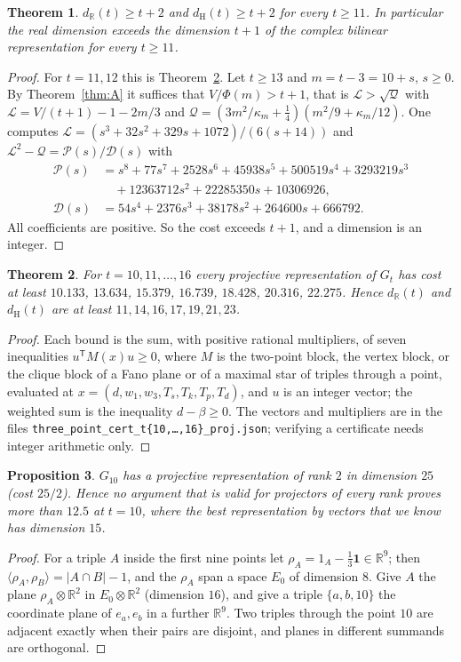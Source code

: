 \documentclass[11pt]{article}
\newtheorem{theorem}{Theorem}
\newtheorem{proposition}[theorem]{Proposition}
\theoremstyle{remark}
\newcommand{\R}{\mathbb{R}}
\newcommand{\ip}[2]{\langle #1,#2\rangle}
\newcommand{\Gt}{G_t}
\begin{document}
\begin{theorem}\label{thm:tplus2}
$d_\R(t)\ge t+2$ and $d_{\mathrm H}(t)\ge t+2$ for every $t\ge11$. In particular the real dimension exceeds the
dimension $t+1$ of the complex bilinear representation for every $t\ge11$.
\end{theorem}
\begin{proof}
For $t=11,12$ this is Theorem~\ref{thm:cert}. Let $t\ge13$ and $m=t-3=10+s$, $s\ge0$. By
Theorem~\ref{thm:A} it suffices that $V/\Phi(m)>t+1$, that is $\mathcal L>\sqrt{\mathcal Q}$ with
$\mathcal L=V/(t+1)-1-2m/3$ and $\mathcal Q=(3m^2/\kappa_m+\tfrac14)(m^2/9+\kappa_m/12)$. One computes
$\mathcal L=(s^3+32s^2+329s+1072)/(6(s+14))$ and
$\mathcal L^2-\mathcal Q=\mathcal P(s)/\mathcal D(s)$ with
\begin{align*}
\mathcal P(s)&=s^8+77s^7+2528s^6+45938s^5+500519s^4+3293219s^3\\
&\quad+12363712s^2+22285350s+10306926,\\
\mathcal D(s)&=54s^4+2376s^3+38178s^2+264600s+666792.
\end{align*}
All coefficients are positive. So the cost exceeds $t+1$, and a dimension is an integer.
\end{proof}

\begin{theorem}\label{thm:cert}
For $t=10,11,\dots,16$ every projective representation of $\Gt$ has cost at least
$10.133$, $13.634$, $15.379$, $16.739$, $18.428$, $20.316$, $22.275$. Hence $d_\R(t)$ and $d_{\mathrm H}(t)$ are
at least $11,14,16,17,19,21,23$.
\end{theorem}
\begin{proof}
Each bound is the sum, with positive rational multipliers, of seven inequalities $u^{\mathsf T}M(x)u\ge0$,
where $M$ is the two-point block, the vertex block, or the clique block of a Fano plane or of a maximal star
of triples through a point, evaluated at $x=(d,w_1,w_3,T_s,T_k,T_p,T_d)$, and $u$ is an integer vector; the
weighted sum is the inequality $d-\beta\ge0$. The vectors and multipliers are in the files
\texttt{three\_point\_cert\_t\{10,\dots,16\}\_proj.json}; verifying a certificate needs integer arithmetic
only.
\end{proof}

\begin{proposition}\label{prop:proj}
$G_{10}$ has a projective representation of rank $2$ in dimension $25$ (cost $25/2$). Hence no argument that
is valid for projectors of every rank proves more than $12.5$ at $t=10$, where the best representation by
vectors that we know has dimension $15$.
\end{proposition}
\begin{proof}
For a triple $A$ inside the first nine points let $\rho_A=1_A-\tfrac13\mathbf 1\in\R^9$; then
$\ip{\rho_A}{\rho_B}=|A\cap B|-1$, and the $\rho_A$ span a space $E_0$ of dimension $8$. Give $A$ the plane
$\rho_A\otimes\R^2$ in $E_0\otimes\R^2$ (dimension $16$), and give a triple $\{a,b,10\}$ the coordinate plane of
$e_a,e_b$ in a further $\R^9$. Two triples through the point $10$ are adjacent exactly when their pairs are
disjoint, and planes in different summands are orthogonal.
\end{proof}
\end{document}
